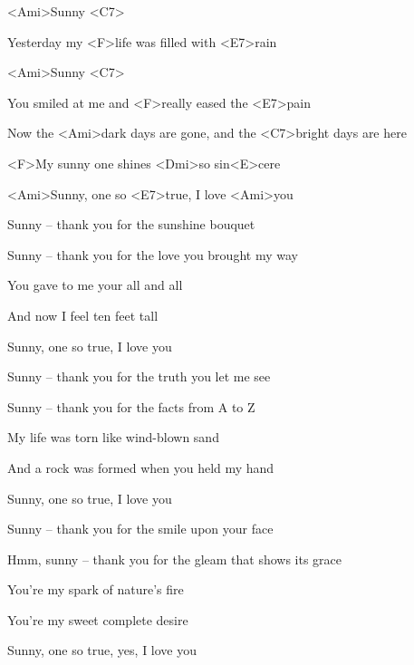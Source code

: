 

\zs
<Ami>Sunny <C7>

Yesterday my <F>life was filled with <E7>rain

<Ami>Sunny <C7>

You smiled at me and <F>really eased the <E7>pain

Now the <Ami>dark days are gone, and the <C7>bright days are here

<F>My sunny one shines <Dmi>so sin<E>cere

<Ami>Sunny, one so <E7>true, I love <Ami>you
\ks

\zs
Sunny – thank you for the sunshine bouquet

Sunny – thank you for the love you brought my way

You gave to me your all and all

And now I feel ten feet tall

Sunny, one so true, I love you
\ks

\zs
Sunny – thank you for the truth you let me see

Sunny – thank you for the facts from A to Z

My life was torn like wind-blown sand

And a rock was formed when you held my hand

Sunny, one so true, I love you
\ks

\zs
Sunny – thank you for the smile upon your face

Hmm, sunny – thank you for the gleam that shows its grace

You're my spark of nature's fire

You're my sweet complete desire

Sunny, one so true, yes, I love you
\ks

\kp
